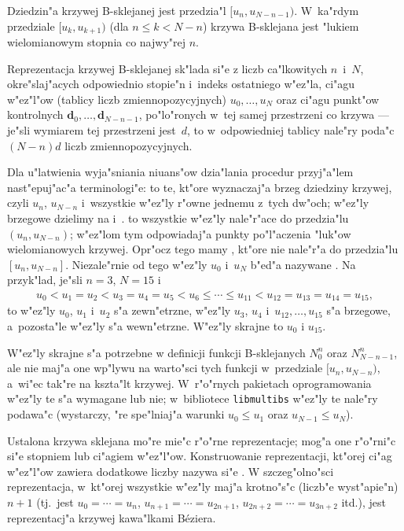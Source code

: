 Dziedzin"a krzywej B-sklejanej jest przedzia"l $[u_n,u_{N-n-1})$. W~ka"rdym
przedziale $[u_k,u_{k+1})$ (dla $n\leq k<N-n$) krzywa \mbox{B-sklejana} jest
"lukiem wielomianowym stopnia co najwy"rej $n$.

Reprezentacja krzywej B-sklejanej sk"lada si"e z liczb ca"lkowitych
$n$~i~$N$, okre"slaj"acych odpowiednio stopie"n i~indeks ostatniego w"ez"la,
ci"agu w"ez"l"ow (tablicy liczb zmiennopozycyjnych) $u_0,\ldots,u_N$ oraz
ci"agu punkt"ow kontrolnych $\bm{d}_0,\ldots,\bm{d}_{N-n-1}$, po"lo"ronych
w~tej samej przestrzeni co krzywa --- je"sli wymiarem tej przestrzeni
jest~$d$, to w~odpowiedniej tablicy nale"ry poda"c $(N-n)d$ liczb
zmiennopozycyjnych.

\vspace{\medskipamount}
\begin{sloppypar}
Dla u"latwienia wyja"sniania niuans"ow dzia"lania procedur przyj"a"lem
nast"epuj"ac"a terminologi"e:  to te, kt"ore
wyznaczaj"a brzeg dziedziny krzywej, czyli $u_n$, $u_{N-n}$ i~wszystkie
w"ez\-"ly r"owne jednemu z~tych dw"och; w"ez\-"ly brzegowe dzielimy na
 i~.  to
wszystkie w"ez"ly nale"r"ace do przedzia"lu $(u_n,u_{N-n})$; w"ez"lom tym
odpowiadaj"a punkty po"l"aczenia "luk"ow wielomianowych krzywej. Opr"ocz
tego mamy , kt"ore nie nale"r"a do
przedzia"lu $[u_n,u_{N-n}]$.
Niezale"rnie od tego w"ez"ly $u_0$ i~$u_N$ b"ed"a nazywane .
Na przyk"lad, je"sli $n=3$, $N=15$ i
\begin{align*}
  u_0<u_1=u_2<u_3=u_4=u_5<u_6\leq\cdots\leq u_{11}<u_{12}=u_{13}=u_{14}=u_{15},
\end{align*}
to w"ez"ly $u_0$, $u_1$ i~$u_2$ s"a zewn"etrzne, w"ez"ly $u_3$, $u_4$
i~$u_{12},\ldots,u_{15}$ s"a brzegowe, a~pozosta"le w"ez"ly s"a wewn"etrzne.
W"ez"ly skrajne to $u_0$ i $u_{15}$.
\end{sloppypar}

W"ez"ly skrajne s"a potrzebne w definicji funkcji
B-sklejanych $N^n_0$ oraz $N^n_{N-n-1}$, ale nie maj"a one wp"lywu na
warto"sci tych funkcji w~przedziale $[u_n,u_{N-n})$, a~wi"ec tak"re na
kszta"lt krzywej. W~r"o"rnych pakietach oprogramowania w"ez"ly te s"a
wymagane lub nie; w~bibliotece \texttt{libmultibs} w"ez"ly te nale"ry
podawa"c (wystarczy, "re spe"lniaj"a warunki $u_0\leq u_1$ oraz
$u_{N-1}\leq u_N$).

\vspace{\medskipamount}
Ustalona krzywa sklejana mo"re mie"c r"o"rne reprezentacje; mog"a one
r"o"rni"c si"e stopniem lub ci"agiem w"ez"l"ow. Konstruowanie reprezentacji,
kt"orej ci"ag w"ez"l"ow zawiera dodatkowe liczby nazywa si"e . W szczeg"olno"sci reprezentacja, w~kt"orej wszystkie w"ez"ly
maj"a krotno"s"c (liczb"e wyst"apie"n) $n+1$ (tj.\ jest
$u_0=\cdots=u_n$, $u_{n+1}=\cdots=u_{2n+1}$, $u_{2n+2}=\cdots=u_{3n+2}$
itd.), jest reprezentacj"a krzywej kawa"lkami B\'{e}ziera.

